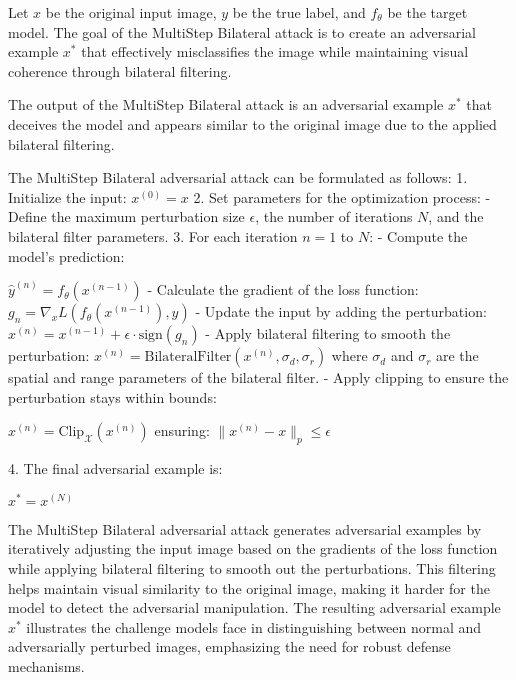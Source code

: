 Let \( x \) be the original input image, \( y \) be the true label, and \( f_{\theta} \) be the target model. The goal of the MultiStep Bilateral attack is to create an adversarial example \( x^* \) that effectively misclassifies the image while maintaining visual coherence through bilateral filtering.

The output of the MultiStep Bilateral attack is an adversarial example \( x^* \) that deceives the model and appears similar to the original image due to the applied bilateral filtering.

The MultiStep Bilateral adversarial attack can be formulated as follows:
1. Initialize the input:
   $x^{(0)} = x$
2. Set parameters for the optimization process:
   - Define the maximum perturbation size \( \epsilon \), the number of iterations \( N \), and the bilateral filter parameters.
3. For each iteration \( n = 1 \) to \( N \):
   - Compute the model's prediction:
   
   $\hat{y}^{(n)} = f_{\theta}(x^{(n-1)})$
   - Calculate the gradient of the loss function:
   $g_n = \nabla_x L(f_{\theta}(x^{(n-1)}), y)$
   - Update the input by adding the perturbation:
   $x^{(n)} = x^{(n-1)} + \epsilon \cdot \text{sign}(g_n)$
   - Apply bilateral filtering to smooth the perturbation:
   $x^{(n)} = \text{BilateralFilter}(x^{(n)}, \sigma_d, \sigma_r)$
   where \(\sigma_d\) and \(\sigma_r\) are the spatial and range parameters of the bilateral filter.
   - Apply clipping to ensure the perturbation stays within bounds:
   
   $x^{(n)} = \text{Clip}_{\mathcal{X}}(x^{(n)})$
   ensuring:
   $\|x^{(n)} - x\|_p \leq \epsilon$

4. The final adversarial example is:
   
   $x^* = x^{(N)}$

The MultiStep Bilateral adversarial attack generates adversarial examples by iteratively adjusting the input image based on the gradients of the loss function while applying bilateral filtering to smooth out the perturbations. This filtering helps maintain visual similarity to the original image, making it harder for the model to detect the adversarial manipulation. The resulting adversarial example \( x^* \) illustrates the challenge models face in distinguishing between normal and adversarially perturbed images, emphasizing the need for robust defense mechanisms.
